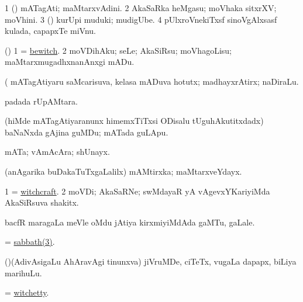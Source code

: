 \bentry
{} 
\gl{\nA}
\expl{}
\bmng
\bnum
\num{1} (\kanmu) mATagAti; maMtarxvAdini. 
\num{2} AkaSaRka heMgasu; moVhaka sitxrXV; moVhini. 
\num{3} (\rUpa) kurUpi muduki; mudigUbe. 
\num{4} pUlxroVnekiTxsf sinoVgAlxsasf kulada, capapxTe miVnu. 
\enum
\emng
\eentry

\bentry
{} 
\gl{\sakirx}
\bmng
(\pArxparx) 
\bnum
\num{1} = \hyperref{kandict_b.pdf}{B}{bewitch}{bewitch}. 
\num{2} moVDihAku; seLe; AkaSiRsu; moVhagoLisu; maMtarxmugadhxnanAnxgi mADu. 
\enum
\emng

\noindent
\gl{\pagu}
\expl{}
\bmng
{} (  mATagAtiyaru saMcarisuva, kelasa mADuva hotutx; madhayxrAtirx; naDiraLu. 
\emng
\eentry

\bentry
{} 
\gl{\sapUpa}
\expl{}
\bmng
{} padada rUpAMtara. 
\emng
\eentry

\bentry
{} 
\gl{\nA}
\expl{}
\bmng
(hiMde mATagAtiyaranunx himemxTiTxsi ODisalu tUguhAkutitxdadx) baNaNxda gAjina guMDu; mATada guLApu. 
\emng
\eentry

\bentry
{} 
\gl{\nA}
\expl{}
\bmng
mATa; vAmAcAra; shUnayx. 
\emng
\eentry

\bentry
{} 
\gl{\nA}
\expl{}
\bmng
(anAgarika buDakaTuTxgaLalilx) mAMtirxka; maMtarxveYdayx. 
\emng
\eentry

\bentry
{} 
\gl{\nA}
\expl{}
\bmng
\bnum
\num{1} = \hyperlink{witchcraft}{witchcraft}. 
\num{2} moVDi; AkaSaRNe; swMdayaR yA vAgevxYKariyiMda AkaSiRsuva shakitx. 
\enum
\emng
\eentry

\bentry
{} 
\gl{\nA}
\expl{}
\bmng
bacfR maragaLa meVle oMdu jAtiya kirxmiyiMdAda gaMTu, gaLale. 
\emng
\eentry

\bentry
{} 
\gl{\nA}
\expl{}
\bmng
= \hyperref{kandict_s.pdf}{S}{sabbath(3)}{sabbath(3)}. 
\emng
\eentry

\bentry
{} 
\gl{\nA}
\bmng
(\AseTxrXV)(AdivAsigaLu AhAravAgi tinunxva) jiVruMDe, ciTeTx, \mo vugaLa dapapx, biLiya marihuLu. 
\emng
\eentry

\bentry
{} 
\gl{\nA}
\expl{}
\bmng
= \hyperlink{witchetty}{witchetty}. 
\emng
\eentry

